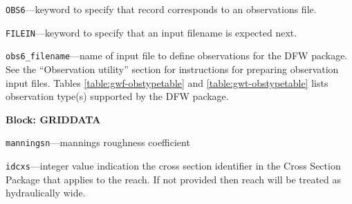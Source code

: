\begin{description}
\item \texttt{OBS6}---keyword to specify that record corresponds to an observations file.

\item \texttt{FILEIN}---keyword to specify that an input filename is expected next.

\item \texttt{obs6\_filename}---name of input file to define observations for the DFW package. See the ``Observation utility'' section for instructions for preparing observation input files. Tables \ref{table:gwf-obstypetable} and \ref{table:gwt-obstypetable} lists observation type(s) supported by the DFW package.

\end{description}
\item \textbf{Block: GRIDDATA}

\begin{description}
\item \texttt{manningsn}---mannings roughness coefficient

\item \texttt{idcxs}---integer value indication the cross section identifier in the Cross Section Package that applies to the reach.  If not provided then reach will be treated as hydraulically wide.

\end{description}

